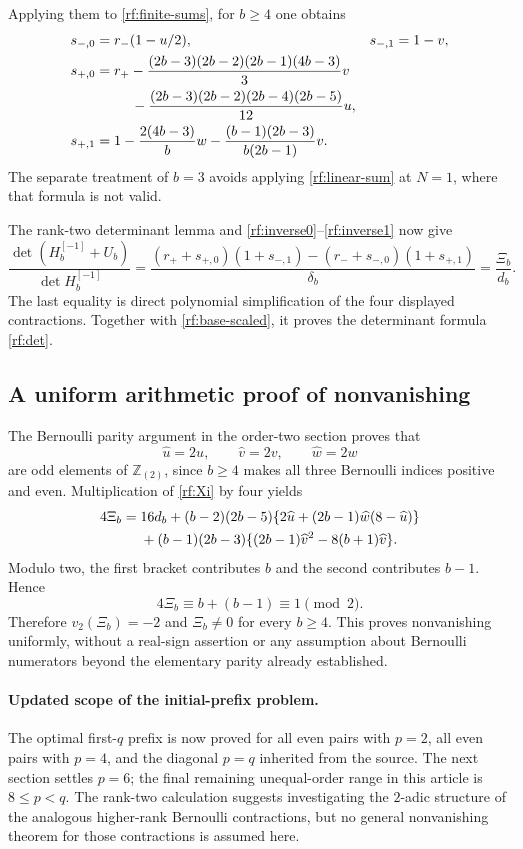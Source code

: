 Applying them to \eqref{rf:finite-sums}, for $b\geq4$ one obtains
\begin{align}
 s_{-,0}&=r_-(1-u/2),& s_{-,1}&=1-v,\notag\\
 s_{+,0}&=r_+
 -\frac{(2b-3)(2b-2)(2b-1)(4b-3)}3v\notag\\
 &\hspace{9mm}
 -\frac{(2b-3)(2b-2)(2b-4)(2b-5)}{12}u,\notag\\
 s_{+,1}&=1-\frac{2(4b-3)}b w
             -\frac{(b-1)(2b-3)}{b(2b-1)}v.
 \label{rf:four-contractions}
\end{align}
The separate treatment of $b=3$ avoids applying
\eqref{rf:linear-sum} at $N=1$, where that formula is not valid.

The rank-two determinant lemma and
\eqref{rf:inverse0}--\eqref{rf:inverse1} now give
\begin{equation}\label{rf:small-det}
 \frac{\det(H_b^{[-1]}+U_b)}{\det H_b^{[-1]}}
 =\frac{(r_++s_{+,0})(1+s_{-,1})
             -(r_-+s_{-,0})(1+s_{+,1})}{\delta_b}
 =\frac{\Xi_b}{d_b}.
\end{equation}
The last equality is direct polynomial simplification of the four
displayed contractions.  Together with \eqref{rf:base-scaled},
it proves the determinant formula \eqref{rf:det}.

\subsection{A uniform arithmetic proof of nonvanishing}

The Bernoulli parity argument in the order-two section proves that
\[
 \widehat u=2u,\qquad\widehat v=2v,\qquad\widehat w=2w
\]
are odd elements of $\mathbb Z_{(2)}$, since $b\geq4$ makes all
three Bernoulli indices positive and even.  Multiplication of
\eqref{rf:Xi} by four yields
\begin{align}
 4\Xi_b={}&16d_b
 +(b-2)(2b-5)
 \{2\widehat u+(2b-1)\widehat w(8-\widehat u)\}\notag\\
 &+(b-1)(2b-3)
 \{(2b-1)\widehat v^2-8(b+1)\widehat v\}.
 \label{rf:parity}
\end{align}
Modulo two, the first bracket contributes $b$ and the second
contributes $b-1$.  Hence
\[
 4\Xi_b\equiv b+(b-1)\equiv1\pmod2.
\]
Therefore $v_2(\Xi_b)=-2$ and $\Xi_b\ne0$ for every $b\geq4$.
This proves nonvanishing uniformly, without a real-sign assertion
or any assumption about Bernoulli numerators beyond the elementary
parity already established.

\paragraph{Updated scope of the initial-prefix problem.}
The optimal first-$q$ prefix is now proved for all even pairs with
$p=2$, all even pairs with $p=4$, and the diagonal $p=q$ inherited
from the source.  The next section settles $p=6$; the final remaining unequal-order
range in this article is $8\leq p<q$.  The rank-two calculation suggests investigating the
$2$-adic structure of the analogous higher-rank Bernoulli
contractions, but no general nonvanishing theorem for those
contractions is assumed here.

